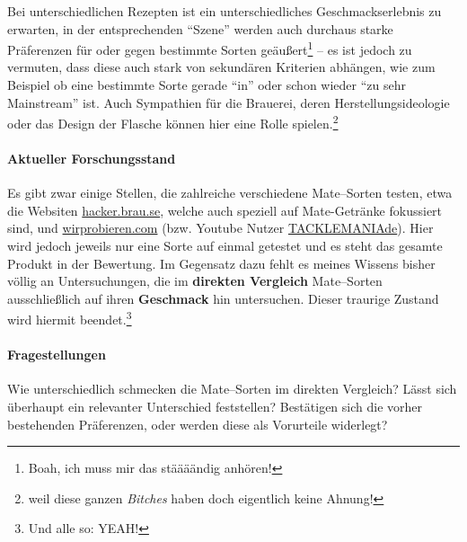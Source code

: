 \documentclass[11pt,a4paper,ngerman]{article}
\begin{document}
Bei unterschiedlichen Rezepten ist ein unterschiedliches Geschmackserlebnis zu erwarten, in der entsprechenden "`Szene"' werden auch durchaus starke Präferenzen für oder gegen bestimmte Sorten geäußert\footnote{Boah, ich muss mir das stäääändig anhören!} -- es ist jedoch zu vermuten, dass diese auch stark von sekundären Kriterien abhängen, wie zum Beispiel ob eine bestimmte Sorte gerade "`in"' oder schon wieder "`zu sehr Mainstream"' ist.  Auch Sympathien für die Brauerei, deren Herstellungsideologie oder das Design der Flasche können hier eine Rolle spielen.\footnote{weil diese ganzen \textit{Bitches} haben doch eigentlich keine Ahnung!}

\paragraph{Aktueller Forschungsstand}
Es gibt zwar einige Stellen, die zahlreiche verschiedene Mate--Sorten testen, etwa die Websiten \href{http://hacker.brau.se/}{hacker.brau.se}, welche auch speziell auf Mate-Getränke fokussiert sind, und \href{http://wirprobieren.com/}{wirprobieren.com} (bzw.  Youtube Nutzer \href{https://www.youtube.com/user/TACKLEMANIAde}{TACKLEMANIAde}). Hier wird jedoch jeweils nur eine Sorte auf einmal getestet und es steht das gesamte Produkt in der Bewertung. Im Gegensatz dazu fehlt es meines Wissens bisher völlig an Untersuchungen, die im \textbf{direkten Vergleich} Mate--Sorten ausschließlich auf ihren \textbf{Geschmack} hin untersuchen. Dieser traurige Zustand wird hiermit beendet.\footnote{Und alle so: YEAH!}

\paragraph{Fragestellungen}
Wie unterschiedlich schmecken die Mate--Sorten im direkten Vergleich? Lässt sich überhaupt ein relevanter Unterschied feststellen? Bestätigen sich die vorher bestehenden Präferenzen, oder werden diese als Vorurteile widerlegt?



\end{document}
